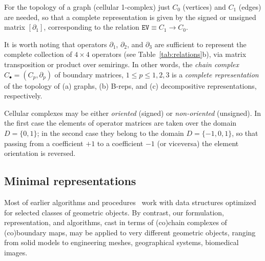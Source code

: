 For the topology of a graph (cellular 1-complex) just $C_0$ (vertices) and $C_1$ (edges) are needed, so that a complete representation is given by the signed or unsigned matrix $[\partial_1]$, corresponding to the relation $\texttt{EV} \equiv C_1\to C_0$.

It is worth noting that operators $\partial_1$, $\partial_2$, and $\partial_3$ are sufficient to represent the complete collection of $4\times 4$ operators (see Table~\ref{tab:relations}b), via matrix transposition or product over semirings. In other words, the \emph{chain complex} $C_\bullet = (C_p, \partial_p)$ of boundary matrices, $1\leq p\leq 1,2,3$ is a \emph{complete representation} of the topology of (a) graphs, (b) B-reps, and (c) decompositive representations, respectively. 

Cellular complexes may be either \emph{oriented} (signed) or \emph{non-oriented} (unsigned). In the first case the elements of operator matrices are taken over the domain $D=\{0,1\}$; in the second case they belong to the domain $D=\{-1,0,1\}$, so that passing from a coefficient $+1$ to a coefficient $-1$ (or viceversa) the element orientation is reversed.


\subsection{Minimal representations}\label{minimal-reps}

Most of earlier algorithms and procedures~\cite{
4055948,
Ala:1992:PAB:616022.617736,
Baumgart:1972:WEP:891970,
bowyer1995introducing,
bowyer1995svlis,
Braid:1975:SSB:360715.360727,
Brisson:1989:RGS:73833.73858,
cadanda,
Dobkin:1987:PMT:41958.41967,
Gomes:1999:MMB:304012.304039,
Guibas:1985:PMG:282918.282923,
HoffmannK01,
Kalay:1989:HET:63718.63719,
Lee:2001:PES:376957.376976,
Lienhardt:1991:TMB:115604.115610,
Mantyla:1988:ISM:60949,
Paoluzzi:1989:BAO:70248.70249,
Paoluzzi:1993:DMS:169728.169719,
Paoluzzi:1995:GPP:212332.212349,
Pascucci:1995:DCB:218013.218055,
Pratt94ashape,
Raghothama:1999:CUD:304012.304019,
Rap97,
RequichaVoelcker:77,
Rossignac:1991:CNG:115604.115606,
Rossignac:SGC:90,
Shapiro:1991:RSS:124951,
Shapiro:1995:PFS:218013.218029,
Silva:81,
Weiler:86,
Weiler:88,
Woo:85,
wozny1990geometric,
Yamaguchi:85,
yamaguchi1995ntb,
Zhou:2016:MAS:2897824.2925901,
bieri:95,
Rossignac:89,
Hoffmann:91,
Hoffmann:1989:GSM:74803,
Hoffmann:1987:RSO:866286} 
work with data
structures optimized for selected classes of geometric
objects. By contrast, our formulation, representation, and algorithms, cast in
terms of (co)chain complexes of (co)boundary maps, may be
applied to very different geometric objects, ranging from solid models
to engineering meshes, geographical systems, biomedical images.

